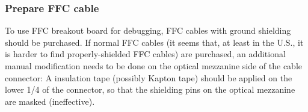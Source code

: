 \subsubsection{Prepare FFC cable}
To use FFC breakout board for debugging, FFC cables with ground shielding should
be purchased.
If normal FFC cables (it seems that, at least in the U.S., it is harder to find
properly-shielded FFC cables) are purchased, an additional manual modification
needs to be done on the optical mezzanine side of the cable connector:
A insulation tape (possibly Kapton tape) should be applied on the lower 1/4 of
the connector, so that the shielding pins on the optical mezzanine are masked
(ineffective).

